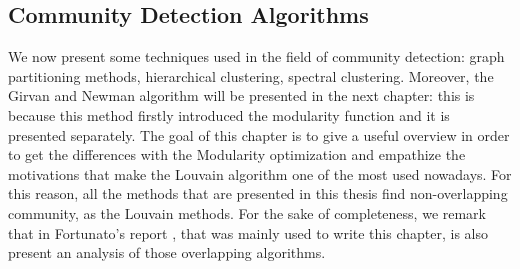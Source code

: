 \subsection{Community Detection Algorithms}
We now present some techniques used in the field of community detection: graph partitioning methods, hierarchical clustering, spectral clustering. Moreover, the Girvan and Newman algorithm will be presented in the next chapter: this is because this method firstly introduced the modularity function and it is presented separately. The goal of this chapter is to give a useful overview in order to get the differences with the Modularity optimization and empathize the motivations that make the Louvain algorithm one of the most used nowadays. For this reason, all the methods that are presented in this thesis find non-overlapping community, as the Louvain methods. For the sake of completeness, we remark that in Fortunato's report \cite{fortunato}, that was mainly used to write this chapter, is also present an analysis of those overlapping algorithms.